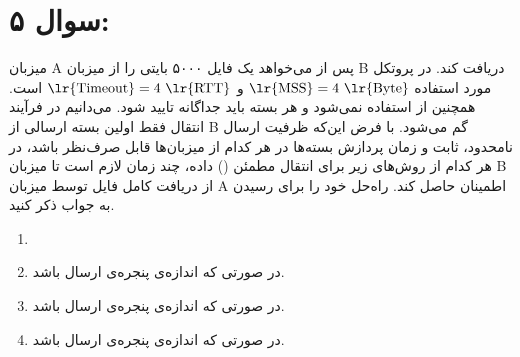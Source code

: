 \section*{سوال ۵:}

میزبان A پس از  می‌خواهد یک فایل ۵۰۰۰ بایتی را از میزبان B دریافت کند. در پروتکل مورد استفاده
\(\text{\lr{MSS}}=4~\text{\lr{Byte}}\) و \(\text{\lr{Timeout}}=4~\text{\lr{RTT}}\) است. همچنین از  استفاده نمی‌شود و هر بسته باید جداگانه تایید شود. می‌دانیم در فرآیند انتقال فقط اولین بسته ارسالی از B گم می‌شود. با فرض این‌که ظرفیت ارسال نامحدود،  ثابت و زمان پردازش بسته‌ها در هر کدام از میزبان‌ها قابل صرف‌نظر باشد، در هر کدام از روش‌های زیر برای انتقال مطمئن () داده، چند  زمان لازم است تا میزبان B از دریافت کامل فایل توسط میزبان A اطمینان حاصل کند. راه‌حل خود را برای رسیدن به جواب ذکر کنید. 

\begin{enumerate}
\begin{enumerate}
  \item {}
  \item {} در صورتی که اندازه‌ی پنجره‌ی ارسال  باشد.
  \item {} در صورتی که اندازه‌ی پنجره‌ی ارسال  باشد.
  \item {} در صورتی که اندازه‌ی پنجره‌ی ارسال  باشد.
\end{enumerate}
\end{enumerate}
